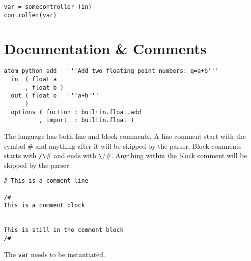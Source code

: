 \begin{verbatim}
var = somecontroller (in)
controller(var)
\end{verbatim}


\section{Documentation \& Comments}

\begin{verbatim}
atom python add   '''Add two floating point numbers: q=a+b'''
  in  ( float a
      , float b )
  out ( float o   '''a+b'''
      )
  options ( fuction : builtin.float.add
          , import  : builtin.float )
\end{verbatim}

The language has both line and block comments. A line comment start
with the symbol \verb### and anything after it will be skipped by the
parser. Block comments starts with \verb#/\## and ends with
\verb#\#/#. Anything within the block comment will be skipped by the
parser.

\begin{verbatim}
# This is a comment line

/#
This is a comment block


This is still in the comment block
/#
\end{verbatim}

The \verb#var# needs to be instantiated.
